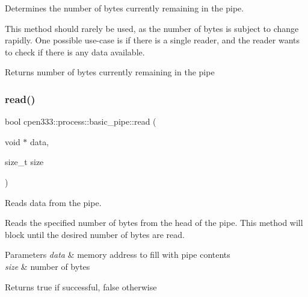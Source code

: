 Determines the number of bytes currently remaining in the pipe. 

This method should rarely be used, as the number of bytes is subject to change rapidly. One possible use-\/case is if there is a single reader, and the reader wants to check if there is any data available.

\begin{DoxyReturn}{Returns}
number of bytes currently remaining in the pipe 
\end{DoxyReturn}
\mbox{\label{classcpen333_1_1process_1_1basic__pipe_a4176320551b61bec3c52d77c6a9a75d2}} 
\subsubsection{\texorpdfstring{read()}{read()}\hspace{0.1cm}{\footnotesize\ttfamily [1/2]}}
{\footnotesize\ttfamily bool cpen333\+::process\+::basic\+\_\+pipe\+::read (\begin{DoxyParamCaption}\item[{void $\ast$}]{data,  }\item[{size\+\_\+t}]{size }\end{DoxyParamCaption})\hspace{0.3cm}{\ttfamily [inline]}}



Reads data from the pipe. 

Reads the specified number of bytes from the head of the pipe. This method will block until the desired number of bytes are read.


\begin{DoxyParams}{Parameters}
{\em data} & memory address to fill with pipe contents \\
\hline
{\em size} & number of bytes \\
\hline
\end{DoxyParams}
\begin{DoxyReturn}{Returns}
true if successful, false otherwise 
\end{DoxyReturn}
\mbox{\label{classcpen333_1_1process_1_1basic__pipe_a61e5b27ee80ba854cbacbfe82b1675e8}} 
